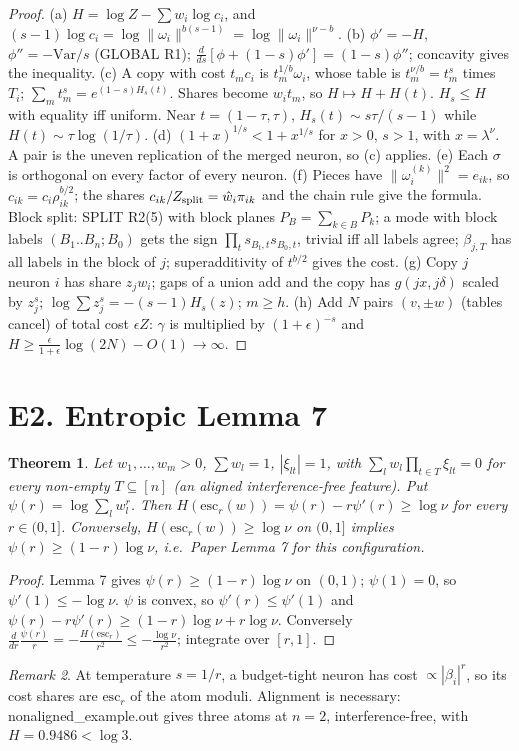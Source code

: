 \documentclass[11pt]{article}
\newtheorem{theorem}{Theorem}\newtheorem{lemma}[theorem]{Lemma}\newtheorem{proposition}[theorem]{Proposition}
\theoremstyle{remark}\newtheorem{remark}[theorem]{Remark}
\begin{document}
\begin{proof}
(a) $H=\log Z-\sum w_i\log c_i$, and $(s-1)\log c_i=\log\|\omega_i\|^{b(s-1)}=\log\|\omega_i\|^{\nu-b}$.
(b) $\phi'=-H$, $\phi''=-\mathrm{Var}/s$ (GLOBAL R1); $\frac{d}{ds}[\phi+(1-s)\phi']=(1-s)\phi''$; concavity gives the inequality.
(c) A copy with cost $t_mc_i$ is $t_m^{1/b}\omega_i$, whose table is $t_m^{\nu/b}=t_m^s$ times $T_i$; $\sum_mt_m^s=e^{(1-s)H_s(t)}$.
Shares become $w_it_m$, so $H\mapsto H+H(t)$. $H_s\le H$ with equality iff uniform. Near $t=(1-\tau,\tau)$, $H_s(t)\sim s\tau/(s-1)$ while $H(t)\sim\tau\log(1/\tau)$.
(d) $(1+x)^{1/s}<1+x^{1/s}$ for $x>0$, $s>1$, with $x=\lambda^\nu$. A pair is the uneven replication of the merged neuron, so (c) applies.
(e) Each $\sigma$ is orthogonal on every factor of every neuron. (f) Pieces have $\|\omega_i^{(k)}\|^2=e_{ik}$, so $c_{ik}=c_i\rho_{ik}^{b/2}$;
the shares $c_{ik}/Z_{\rm split}=\hat w_i\pi_{ik}$ and the chain rule give the formula. Block split: SPLIT R2(5) with block planes
$P_B=\sum_{k\in B}P_k$; a mode with block labels $(B_1..B_n;B_0)$ gets the sign $\prod_ts_{B_t,t}s_{B_0,t}$, trivial iff all labels agree;
$\beta_{j,T}$ has all labels in the block of $j$; superadditivity of $t^{b/2}$ gives the cost.
(g) Copy $j$ neuron $i$ has share $z_jw_i$; gaps of a union add and the copy has $g(jx,j\delta)$ scaled by $z_j^s$;
$\log\sum z_j^s=-(s-1)H_s(z)$; $m\ge h$.
(h) Add $N$ pairs $(v,\pm w)$ (tables cancel) of total cost $\epsilon Z$: $\gamma$ is multiplied by $(1+\epsilon)^{-s}$ and
$H\ge\frac{\epsilon}{1+\epsilon}\log(2N)-O(1)\to\infty$.
\end{proof}

\section{E2. Entropic Lemma 7}
\begin{theorem}\label{t:el7}
Let $w_1,\dots,w_m>0$, $\sum w_l=1$, $|\xi_{lt}|=1$, with $\sum_lw_l\prod_{t\in T}\xi_{lt}=0$ for every non-empty $T\subseteq[n]$
(an aligned interference-free feature). Put $\psi(r)=\log\sum_lw_l^r$. Then $H(\mathrm{esc}_r(w))=\psi(r)-r\psi'(r)\ge\log\nu$ for every $r\in(0,1]$.
Conversely, $H(\mathrm{esc}_r(w))\ge\log\nu$ on $(0,1]$ implies $\psi(r)\ge(1-r)\log\nu$, i.e.\ Paper Lemma 7 for this configuration.
\end{theorem}
\begin{proof}
Lemma 7 gives $\psi(r)\ge(1-r)\log\nu$ on $(0,1)$; $\psi(1)=0$, so $\psi'(1)\le-\log\nu$. $\psi$ is convex, so $\psi'(r)\le\psi'(1)$ and
$\psi(r)-r\psi'(r)\ge(1-r)\log\nu+r\log\nu$. Conversely $\frac{d}{dr}\frac{\psi(r)}r=-\frac{H(\mathrm{esc}_r)}{r^2}\le-\frac{\log\nu}{r^2}$; integrate over $[r,1]$.
\end{proof}
\begin{remark}At temperature $s=1/r$, a budget-tight neuron has cost $\propto|\beta_i|^r$, so its cost shares are $\mathrm{esc}_r$ of the atom moduli.
Alignment is necessary: nonaligned\_example.out gives three atoms at $n=2$, interference-free, with $H=0.9486<\log3$.\end{remark}
\end{document}
